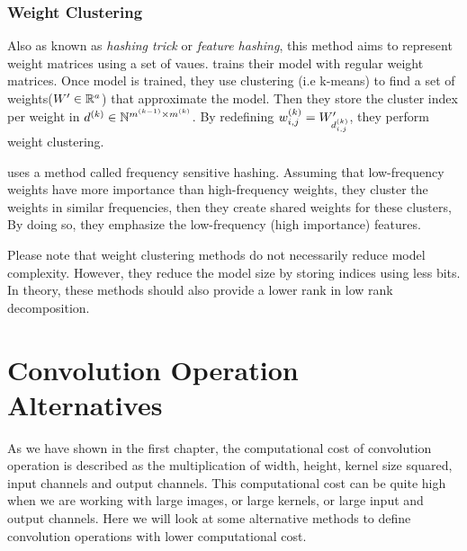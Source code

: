 \subsubsection{Weight Clustering}
Also as known as \textit{hashing trick} or \textit{feature hashing}, this method aims to represent weight matrices using a set of vaues. \cite{nowlan1992simplifying} trains their model with regular weight matrices. Once model is trained, they use clustering (i.e k-means) to find a set of weights($\all\weights' \inreal{a}$) that approximate the model. Then they store the cluster index per weight in $d^{(k)} \in \mathbb{N}^{m^{(k-1)} \times m^{(k)}}$. By redefining $\wk{k}_{i,j} = \all\weights'_{d^{(k)}_{i,j}}$, they perform weight clustering. 

\cite{chen2015compressing} uses a method called frequency sensitive hashing. Assuming that low-frequency weights have more importance than high-frequency weights, they cluster the weights in similar frequencies, then they create shared weights for these clusters, By doing so, they emphasize the low-frequency (high importance) features.

Please note that weight clustering methods do not necessarily reduce model complexity. However, they reduce the model size by storing indices using less bits. In theory, these methods should also provide a lower rank in low rank decomposition. 

\section{Convolution Operation Alternatives}
\label{sec:conv_alternatives}
As we have shown in the first chapter, the computational cost of convolution operation is described as the multiplication of width, height, kernel size squared, input channels and output channels. This computational cost can be quite high when we are working with large images, or large kernels, or large input and output channels. Here we will look at some alternative methods to define convolution operations with lower computational cost.
